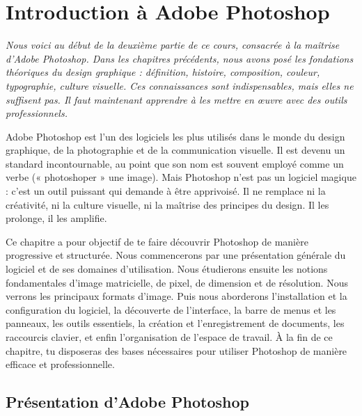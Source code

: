 
\chapter{Introduction à Adobe Photoshop}

\noindent
\textit{Nous voici au début de la deuxième partie de ce cours, consacrée à la maîtrise d'Adobe Photoshop. Dans les chapitres précédents, nous avons posé les fondations théoriques du design graphique : définition, histoire, composition, couleur, typographie, culture visuelle. Ces connaissances sont indispensables, mais elles ne suffisent pas. Il faut maintenant apprendre à les mettre en œuvre avec des outils professionnels.}

\vspace{1em}

\noindent
Adobe Photoshop est l'un des logiciels les plus utilisés dans le monde du design graphique, de la photographie et de la communication visuelle. Il est devenu un standard incontournable, au point que son nom est souvent employé comme un verbe (« photoshoper » une image). Mais Photoshop n'est pas un logiciel magique : c'est un outil puissant qui demande à être apprivoisé. Il ne remplace ni la créativité, ni la culture visuelle, ni la maîtrise des principes du design. Il les prolonge, il les amplifie.

\vspace{1em}

\noindent
Ce chapitre a pour objectif de te faire découvrir Photoshop de manière progressive et structurée. Nous commencerons par une présentation générale du logiciel et de ses domaines d'utilisation. Nous étudierons ensuite les notions fondamentales d'image matricielle, de pixel, de dimension et de résolution. Nous verrons les principaux formats d'image. Puis nous aborderons l'installation et la configuration du logiciel, la découverte de l'interface, la barre de menus et les panneaux, les outils essentiels, la création et l'enregistrement de documents, les raccourcis clavier, et enfin l'organisation de l'espace de travail. À la fin de ce chapitre, tu disposeras des bases nécessaires pour utiliser Photoshop de manière efficace et professionnelle.

\section{Présentation d'Adobe Photoshop}

